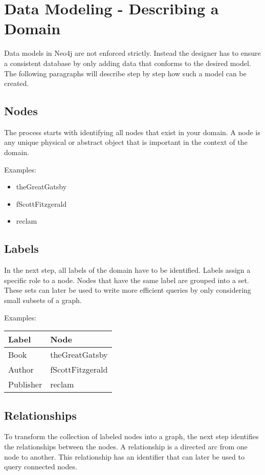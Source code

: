 \section{Data Modeling - Describing a Domain}
Data models in Neo4j are not enforced strictly. Instead the designer has to ensure a consistent database by only adding data that conforms to the desired model. The following paragraphs will describe step by step how such a model can be created.

\subsection{Nodes}
The process starts with identifying all nodes that exist in your domain. A node is any unique physical or abstract object that is important in the context of the domain.

Examples:
\begin{itemize}
	\item theGreatGatsby
	\item fScottFitzgerald
	\item reclam
\end{itemize}

\subsection{Labels}
In the next step, all labels of the domain have to be identified. Labels assign a specific role to a node. Nodes that have the same label are grouped into a set. These sets can later be used to write more efficient queries by only considering small subsets of a graph.

Examples:
\begin{tabular}{ | l | l | }
  \hline
  \textbf{Label} & \textbf{Node} \\
  \hline
  Book & theGreatGatsby \\
  \hline
  Author & fScottFitzgerald \\
  \hline
  Publisher & reclam \\
  \hline
\end{tabular}

\subsection{Relationships}
To transform the collection of labeled nodes into a graph, the next step identifies the relationships between the nodes. A relationship is a directed arc from one node to another. This relationship has an identifier that can later be used to query connected nodes.
	
